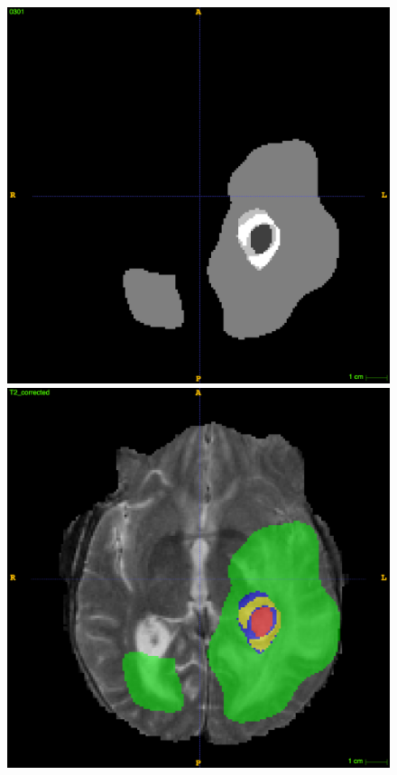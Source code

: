\documentclass[12pt,a4paper,twoside,openright]{report}
\begin{document}
\begin{figure}[h]
	\\
	\vspace{0.5cm}
	\includegraphics[scale = 0.1]{challenge_1_segmentation_71}
	\includegraphics[scale = 0.1]{challenge_1_segmentation_with_T2_71}

\end{figure}
\end{document}
